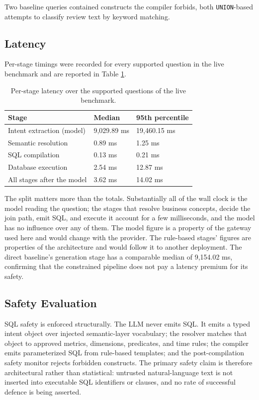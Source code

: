\documentclass[pdflatex,sn-mathphys-num]{sn-jnl}
\begin{document}
Two baseline queries contained constructs the compiler forbids, both \texttt{UNION}-based attempts to classify review text by keyword matching.


\subsection{Latency}

Per-stage timings were recorded for every supported question in the live benchmark and are reported in Table \ref{tab:7}.


\begin{table}[t]
\caption{Per-stage latency over the supported questions of the live benchmark.}
\label{tab:7}
\centering
\renewcommand{\arraystretch}{1.15}
\begin{tabular}{lll}
\toprule
Stage & Median & 95th percentile \\
\midrule
Intent extraction (model) & 9,029.89 ms & 19,460.15 ms \\
Semantic resolution & 0.89 ms & 1.25 ms \\
SQL compilation & 0.13 ms & 0.21 ms \\
Database execution & 2.54 ms & 12.87 ms \\
All stages after the model & 3.62 ms & 14.02 ms \\
\bottomrule
\end{tabular}
\end{table}

The split matters more than the totals. Substantially all of the wall clock is the model reading the question; the stages that resolve business concepts, decide the join path, emit SQL, and execute it account for a few milliseconds, and the model has no influence over any of them. The model figure is a property of the gateway used here and would change with the provider. The rule-based stages' figures are properties of the architecture and would follow it to another deployment. The direct baseline's generation stage has a comparable median of 9,154.02 ms, confirming that the constrained pipeline does not pay a latency premium for its safety.


\subsection{Safety Evaluation}

SQL safety is enforced structurally. The LLM never emits SQL. It emits a typed intent object over injected semantic-layer vocabulary; the resolver matches that object to approved metrics, dimensions, predicates, and time rules; the compiler emits parameterized SQL from rule-based templates; and the post-compilation safety monitor rejects forbidden constructs. The primary safety claim is therefore architectural rather than statistical: untrusted natural-language text is not inserted into executable SQL identifiers or clauses, and no rate of successful defence is being asserted.
\end{document}
